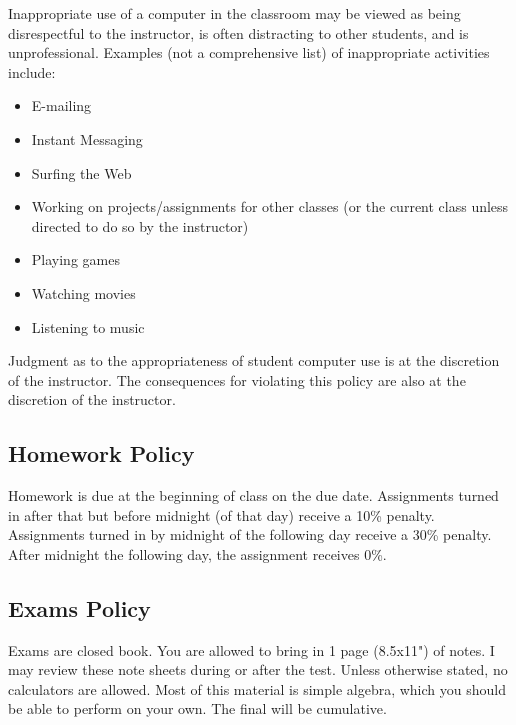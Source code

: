 \documentclass{article}
\begin{document}
Inappropriate use of a computer in the classroom may be viewed as being disrespectful to the instructor, is often distracting to other students, and is unprofessional. Examples (not a comprehensive list) of inappropriate activities include:
\\
\begin{itemize}
  \item E-mailing
  \item Instant Messaging
  \item Surfing the Web
  \item Working on projects/assignments for other classes (or the current class unless directed to do so by the instructor)
  \item Playing games
  \item Watching movies
  \item Listening to music
\end{itemize}

Judgment as to the appropriateness of student computer use is at the discretion of the instructor. The consequences for violating this policy are also at the discretion of the instructor.

\subsection{Homework Policy}
Homework is due at the beginning of class on the due date.  Assignments turned in after that but before midnight (of that day) receive a 10\% penalty.  Assignments turned in by midnight of the following day receive a 30\% penalty.  After midnight the following day, the assignment receives 0\%.

\subsection{Exams Policy}
Exams are closed book.  You are allowed to bring in 1 page (8.5x11") of notes.  I may review these note sheets during or after the test.  Unless otherwise stated, no calculators are allowed.  Most of this material is simple algebra, which you should be able to perform on your own.  The final will be cumulative.
\end{document}
